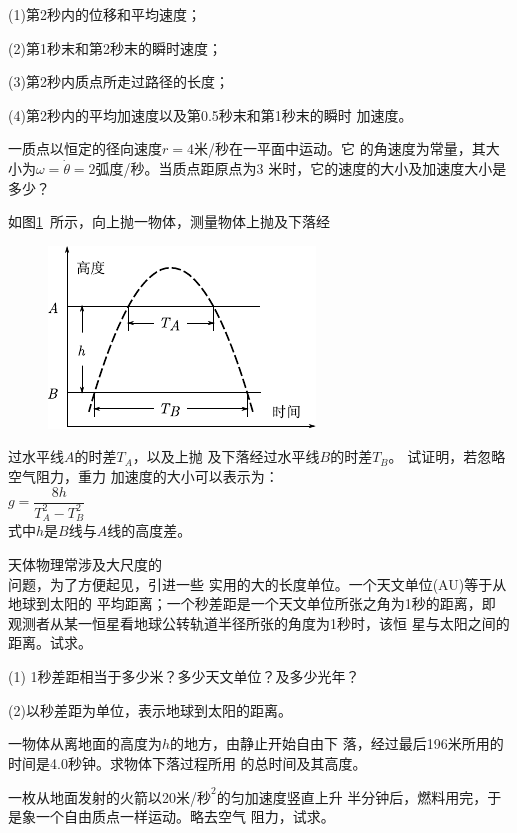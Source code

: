 \begin{exercises}
(1)第2秒内的位移和平均速度；

(2)第1秒末和第2秒末的瞬时速度；

(3)第2秒内质点所走过路径的长度；

(4)第2秒内的平均加速度以及第0.5秒末和第1秒末的瞬时
加速度。

\exercise 一质点以恒定的径向速度$r=4$米/秒在一平面中运动。它
的角速度为常量，其大小为$\omega=\dot\theta=2$弧度/秒。当质点距原点为3
米时，它的速度的大小及加速度大小是多少？

{
\exercise 如图\ref{fig:01.29}~所示，向上抛一物体，测量物体上抛及下落经
\begin{figure}
    \vspace{1em}
    \begin{center}
        \includegraphics{figure/fig01.29}
        \caption{}
        \label{fig:01.29}
    \end{center}
\end{figure}
过水平线$A$的时差$T_A$，以及上抛
及下落经过水平线$B$的时差$T_B$。
试证明，若忽略空气阻力，重力
加速度的大小可以表示为：\\
\null\hspace{3em}$g=\dfrac{8h}{T_A^2 - T_B^2}$ \\
式中$h$是$B$线与$A$线的高度差。}

\exercise 天体物理常涉及大尺度的\\
问题，为了方便起见，引进一些
\clearpage
\noindent 实用的大的长度单位。一个天文单位(AU)等于从地球到太阳的
平均距离；一个秒差距是一个天文单位所张之角为1秒的距离，即
观测者从某一恒星看地球公转轨道半径所张的角度为1秒时，该恒
星与太阳之间的距离。试求。

(1) 1秒差距相当于多少米？多少天文单位？及多少光年？

(2)以秒差距为单位，表示地球到太阳的距离。

\exercise 一物体从离地面的高度为$ h $的地方，由静止开始自由下
落，经过最后196米所用的时间是4.0秒钟。求物体下落过程所用
的总时间及其高度。

\exercise 一枚从地面发射的火箭以20米/$\text{秒}^2$的匀加速度竖直上升
半分钟后，燃料用完，于是象一个自由质点一样运动。略去空气
阻力，试求。


\end{exercises}
